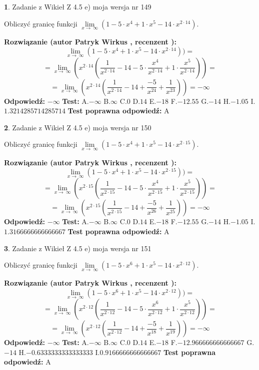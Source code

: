 \documentclass[12pt, a4paper]{article}
\theoremstyle{definition} %
\newtheorem{zad}{}
\newcommand{\zadStart}[1]{\begin{zad}#1\newline}
\newcommand{\zadStop}{\end{zad}}
\newcommand{\rozwStart}[2]{\noindent \textbf{Rozwiązanie (autor #1 , recenzent #2): }\newline}
\newcommand{\rozwStop}{\newline}
\newcommand{\odpStart}{\noindent \textbf{Odpowiedź:}\newline}
\newcommand{\odpStop}{\newline}
\newcommand{\testStart}{\noindent \textbf{Test:}\newline}
\newcommand{\testStop}{\newline}
\newcommand{\kluczStart}{\noindent \textbf{Test poprawna odpowiedź:}\newline}
\newcommand{\kluczStop}{\newline}
\begin{document}
\zadStart{Zadanie z Wikieł Z 4.5 e) moja wersja nr 149}


Obliczyć granicę funkcji  $\lim\limits_{x\to\ \infty}(1 - 5 \cdot x^{4}+1 \cdot x^{5}- 14 \cdot x^{2\cdot14})$.
\zadStop
\rozwStart{Patryk Wirkus}{}
$$\lim\limits_{x\to\ \infty}(1 - 5 \cdot x^{4}+1 \cdot x^{5}- 14 \cdot x^{2\cdot14}))=$$
$$=\lim\limits_{x\to\ \infty}(x^{2\cdot14}(\frac{1}{x^{2\cdot14}}-14 -5 \cdot \frac{x^{4}}{x^{2\cdot14}}+1 \cdot \frac{x^{5}}{x^{2\cdot14}}))=$$
$$=\lim\limits_{x\to\ \infty}(x^{2\cdot14}(\frac{1}{x^{2\cdot14}}-14 + \frac{-5}{x^{24}}+ \frac{1}{x^{23}}))=-\infty$$
\rozwStop
\odpStart
$-\infty$
\odpStop
\testStart
A.$-\infty$ B.$\infty$ C.$0$ D.$14$ E.$-18$
F.$-12.55$ G.$-14$
H.$-1.05$
I.$1.3214285714285714$
\testStop
\kluczStart
A
\kluczStop



\zadStart{Zadanie z Wikieł Z 4.5 e) moja wersja nr 150}


Obliczyć granicę funkcji  $\lim\limits_{x\to\ \infty}(1 - 5 \cdot x^{4}+1 \cdot x^{5}- 14 \cdot x^{2\cdot15})$.
\zadStop
\rozwStart{Patryk Wirkus}{}
$$\lim\limits_{x\to\ \infty}(1 - 5 \cdot x^{4}+1 \cdot x^{5}- 14 \cdot x^{2\cdot15}))=$$
$$=\lim\limits_{x\to\ \infty}(x^{2\cdot15}(\frac{1}{x^{2\cdot15}}-14 -5 \cdot \frac{x^{4}}{x^{2\cdot15}}+1 \cdot \frac{x^{5}}{x^{2\cdot15}}))=$$
$$=\lim\limits_{x\to\ \infty}(x^{2\cdot15}(\frac{1}{x^{2\cdot15}}-14 + \frac{-5}{x^{26}}+ \frac{1}{x^{25}}))=-\infty$$
\rozwStop
\odpStart
$-\infty$
\odpStop
\testStart
A.$-\infty$ B.$\infty$ C.$0$ D.$14$ E.$-18$
F.$-12.55$ G.$-14$
H.$-1.05$
I.$1.3166666666666667$
\testStop
\kluczStart
A
\kluczStop



\zadStart{Zadanie z Wikieł Z 4.5 e) moja wersja nr 151}


Obliczyć granicę funkcji  $\lim\limits_{x\to\ \infty}(1 - 5 \cdot x^{6}+1 \cdot x^{5}- 14 \cdot x^{2\cdot12})$.
\zadStop
\rozwStart{Patryk Wirkus}{}
$$\lim\limits_{x\to\ \infty}(1 - 5 \cdot x^{6}+1 \cdot x^{5}- 14 \cdot x^{2\cdot12}))=$$
$$=\lim\limits_{x\to\ \infty}(x^{2\cdot12}(\frac{1}{x^{2\cdot12}}-14 -5 \cdot \frac{x^{6}}{x^{2\cdot12}}+1 \cdot \frac{x^{5}}{x^{2\cdot12}}))=$$
$$=\lim\limits_{x\to\ \infty}(x^{2\cdot12}(\frac{1}{x^{2\cdot12}}-14 + \frac{-5}{x^{18}}+ \frac{1}{x^{19}}))=-\infty$$
\rozwStop
\odpStart
$-\infty$
\odpStop
\testStart
A.$-\infty$ B.$\infty$ C.$0$ D.$14$ E.$-18$
F.$-12.966666666666667$ G.$-14$
H.$-0.6333333333333333$
I.$0.9166666666666667$
\testStop
\kluczStart
A
\kluczStop
\end{document}
